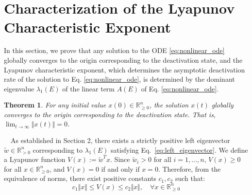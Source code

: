 \documentclass[11pt,a4paper]{article}
\newtheorem{theo}{Theorem}[section]
\begin{document}
\section{Characterization of the Lyapunov Characteristic Exponent}\label{sec:lyapunov}
In this section, we prove that any solution to the ODE \eqref{eq:nonlinear_ode} globally converges to the origin corresponding to the deactivation state, and the Lyapunov characteristic exponent, which determines the asymptotic deactivation rate of the solution to Eq. \eqref{eq:nonlinear_ode}, is determined by the dominant eigenvalue $\lambda_1(E)$ of the linear term $A(E)$ of Eq. \eqref{eq:nonlinear_ode}.
\begin{theo}\label{theo:global_stability}
For any initial value $x(0) \in \mathbb{R}^n_{\ge 0}$, the solution $x(t)$ globally converges to the origin corresponding to the deactivation state. That is, $\lim_{t \to \infty} \Vert{}x(t)\Vert{} = 0$.
\end{theo}
~~As established in Section 2, there exists a strictly positive left eigenvector $\tilde{w} \in \mathbb{R}^n_{>0}$ corresponding to $\lambda_1(E)$ satisfying Eq.~\eqref{eq:left_eigenvector}. We define a Lyapunov function $V(x) := \tilde{w}^T x$. Since $\tilde{w}_i > 0$ for all $i=1,\ldots,n$, $V(x) \ge 0$ for all $x \in {\mathbb R}_{\geq 0}^n$, and $V(x) = 0$ if and only if $x = 0$. Therefore, from the equivalence of norms, there exist positive constants $c_1, c_2$ such that:
\begin{equation}
c_1\Vert{}x\Vert{} \le V(x) \le c_2\Vert{}x\Vert{}, \quad \forall x \in \mathbb{R}^n_{\ge 0} \label{eq:norm_equiv}
\end{equation}
\end{document}
